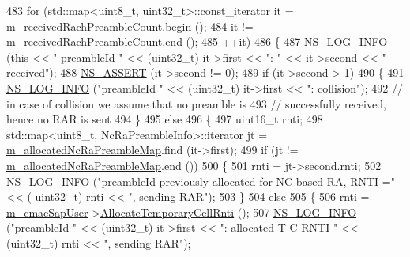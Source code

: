 \begin{DoxyCode}
483       \textcolor{keywordflow}{for} (std::map<uint8\_t, uint32\_t>::const\_iterator it = 
      \hyperlink{classns3_1_1LteEnbMac_a3f2ae0439200f19f8e046510579494a0}{m\_receivedRachPreambleCount}.begin ();
484            it != \hyperlink{classns3_1_1LteEnbMac_a3f2ae0439200f19f8e046510579494a0}{m\_receivedRachPreambleCount}.end ();
485            ++it)
486         \{
487           \hyperlink{group__logging_gafbd73ee2cf9f26b319f49086d8e860fb}{NS\_LOG\_INFO} (\textcolor{keyword}{this} << \textcolor{stringliteral}{" preambleId "} << (uint32\_t) it->first << \textcolor{stringliteral}{": "} << it->second << \textcolor{stringliteral}{"
       received"});
488           \hyperlink{assert_8h_a6dccdb0de9b252f60088ce281c49d052}{NS\_ASSERT} (it->second != 0);
489           \textcolor{keywordflow}{if} (it->second > 1)
490             \{
491               \hyperlink{group__logging_gafbd73ee2cf9f26b319f49086d8e860fb}{NS\_LOG\_INFO} (\textcolor{stringliteral}{"preambleId "} << (uint32\_t) it->first << \textcolor{stringliteral}{": collision"});
492               \textcolor{comment}{// in case of collision we assume that no preamble is}
493               \textcolor{comment}{// successfully received, hence no RAR is sent }
494             \}
495           \textcolor{keywordflow}{else}
496             \{
497               uint16\_t rnti;
498               std::map<uint8\_t, NcRaPreambleInfo>::iterator jt = 
      \hyperlink{classns3_1_1LteEnbMac_aa4d985440ec2e62eb521203a8e96e901}{m\_allocatedNcRaPreambleMap}.find (it->first);
499               \textcolor{keywordflow}{if} (jt != \hyperlink{classns3_1_1LteEnbMac_aa4d985440ec2e62eb521203a8e96e901}{m\_allocatedNcRaPreambleMap}.end ())
500                 \{
501                   rnti = jt->second.rnti;
502                   \hyperlink{group__logging_gafbd73ee2cf9f26b319f49086d8e860fb}{NS\_LOG\_INFO} (\textcolor{stringliteral}{"preambleId previously allocated for NC based RA, RNTI ="} << (
      uint32\_t) rnti << \textcolor{stringliteral}{", sending RAR"});                  
503                 \}
504               \textcolor{keywordflow}{else}
505                 \{
506                   rnti = \hyperlink{classns3_1_1LteEnbMac_adc8aeb0583200cc4a0923dc445a61cf2}{m\_cmacSapUser}->\hyperlink{classns3_1_1LteEnbCmacSapUser_af022be8bca9d5d9969d9aced42a8793d}{AllocateTemporaryCellRnti} ();
507                   \hyperlink{group__logging_gafbd73ee2cf9f26b319f49086d8e860fb}{NS\_LOG\_INFO} (\textcolor{stringliteral}{"preambleId "} << (uint32\_t) it->first << \textcolor{stringliteral}{": allocated T-C-RNTI "} 
      << (uint32\_t) rnti << \textcolor{stringliteral}{", sending RAR"});

\end{DoxyCode}
